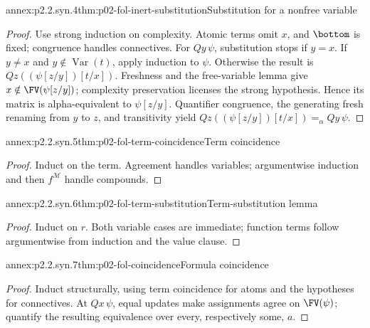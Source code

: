\begin{annexitem}{annex:p2.2.syn.4}{thm:p02-fol-inert-substitution}{Substitution for a nonfree variable}
\begin{proof}
Use strong induction on complexity.  Atomic terms omit \(x\), and
\(\bottom\) is fixed; congruence handles connectives.  For \(Qy\,\psi\),
substitution stops if \(y=x\).  If \(y\ne x\) and
\(y\notin\operatorname{Var}(t)\), apply induction to \(\psi\).  Otherwise
the result is \(Qz((\psi[z/y])[t/x])\).  Freshness and the free-variable
lemma give \(x\notin\FV(\psi[z/y])\); complexity preservation licenses the
strong hypothesis.  Hence its matrix is alpha-equivalent to \(\psi[z/y]\).
Quantifier congruence, the generating fresh renaming from \(y\) to \(z\),
and transitivity yield \(Qz((\psi[z/y])[t/x])=_{\alpha} Qy\,\psi\).
\end{proof}
\end{annexitem}

\begin{annexitem}{annex:p2.2.syn.5}{thm:p02-fol-term-coincidence}{Term coincidence}
\begin{proof}
Induct on the term.  Agreement handles variables; argumentwise induction and
then \(f^{\mathcal M}\) handle compounds.
\end{proof}
\end{annexitem}

\begin{annexitem}{annex:p2.2.syn.6}{thm:p02-fol-term-substitution}{Term-substitution lemma}
\begin{proof}
Induct on \(r\).  Both variable cases are immediate; function terms follow
argumentwise from induction and the value clause.
\end{proof}
\end{annexitem}

\begin{annexitem}{annex:p2.2.syn.7}{thm:p02-fol-coincidence}{Formula coincidence}
\begin{proof}
Induct structurally, using term coincidence for atoms and the hypotheses for
connectives.  At \(Qx\,\psi\), equal updates make assignments agree on
\(\FV(\psi)\); quantify the resulting equivalence over every, respectively
some, \(a\).
\end{proof}
\end{annexitem}

